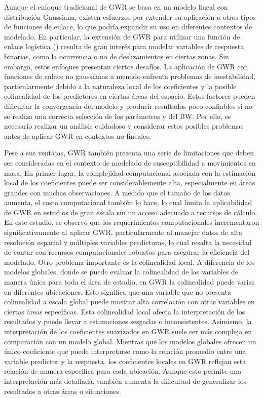 \documentclass[
  manuscript=article,  
  layout=preprint,  
]{format}
\begin{document}
Aunque el enfoque tradicional de GWR se basa en un modelo lineal con distribución Gaussiana, existen esfuerzos por extender su aplicación a otros tipos de funciones de enlace, lo que podría expandir su uso en diferentes contextos de modelado. En particular, la extensión de GWR para utilizar una función de enlace logística (\cite{nkeki2019geographically}) resulta de gran interés para modelar variables de respuesta binarias, como la ocurrencia o no de deslizamientos en ciertas zonas. Sin embargo, estos enfoques presentan ciertos desafíos. La aplicación de GWR con funciones de enlace no gaussianas a menudo enfrenta problemas de inestabilidad, particularmente debido a la naturaleza local de los coeficientes y la posible colinealidad de los predictores en ciertas áreas del espacio. Estos factores pueden dificultar la convergencia del modelo y producir resultados poco confiables si no se realiza una correcta selección de los parámetros y del BW. Por ello, es necesario realizar un análisis cuidadoso y considerar estos posibles problemas antes de aplicar GWR en contextos no lineales.

Pese a sus ventajas, GWR también presenta una serie de limitaciones que deben ser consideradas en el contexto de modelado de susceptibilidad a movimientos en masa. En primer lugar, la complejidad computacional asociada con la estimación local de los coeficientes puede ser considerablemente alta, especialmente en áreas grandes con muchas observaciones. A medida que el tamaño de los datos aumenta, el costo computacional también lo hace, lo cual limita la aplicabilidad de GWR en estudios de gran escala sin un acceso adecuado a recursos de cálculo. En este estudio, se observó que los requerimientos computacionales incrementaron significativamente al aplicar GWR, particularmente al manejar datos de alta resolución espacial y múltiples variables predictoras, lo cual resalta la necesidad de contar con recursos computacionales robustos para asegurar la eficiencia del modelado. Otro problema importante es la colinealidad local. A diferencia de los modelos globales, donde se puede evaluar la colinealidad de las variables de manera única para toda el área de estudio, en GWR la colinealidad puede variar en diferentes ubicaciones. Esto significa que una variable que no presenta colinealidad a escala global puede mostrar alta correlación con otras variables en ciertas áreas específicas. Esta colinealidad local afecta la interpretación de los resultados y puede llevar a estimaciones sesgadas o inconsistentes. Asimismo, la interpretación de los coeficientes suavizados en GWR suele ser más compleja en comparación con un modelo global. Mientras que los modelos globales ofrecen un único coeficiente que puede interpretarse como la relación promedio entre una variable predictor y la respuesta, los coeficientes locales en GWR reflejan esta relación de manera específica para cada ubicación. Aunque esto permite una interpretación más detallada, también aumenta la dificultad de generalizar los resultados a otras áreas o situaciones.
\end{document}
